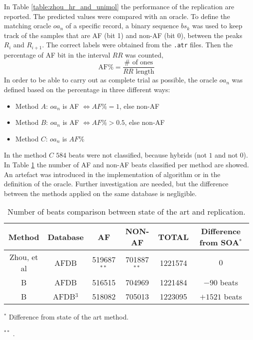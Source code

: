 In Table \ref{table:zhou_hr_and_unimol} the performance of the replication are reported. The predicted values were compared with an oracle. To define the matching oracle $oa_n$ of a specific record, a binary sequence $bs_k$ was used to keep track of the samples that are AF (bit 1) and non-AF (bit 0), between the peaks $R_i$ and $R_{i+1}$. The correct labels were obtained from the \verb|.atr| files. Then the percentage of AF bit in the interval $RR$ was counted,
\begin{equation}
 \text{AF\%} = \frac{\# \text{ of ones}}{RR \text{ length}}
\end{equation}
In order to be able to carry out as complete trial as possible, the oracle $oa_n$ was defined based on the percentage in three different ways:
\begin{itemize}
\item Method $A$: $oa_n$ is AF $\iff AF\% = 1$, else non-AF
\item Method $B$: $oa_n$ is AF $\iff AF\% > 0.5$, else non-AF
\item Method $C$: $oa_n$ is $AF\%$
\end{itemize}
In the method $C$ $584$ beats were not classified, because hybrids (not $1$ and not $0$). In Table \ref{table:replication_error} the number of AF and non-AF beats classified per method are showed. An artefact was introduced in the implementation of algorithm or in the definition of the oracle. Further investigation are needed, but the difference between the methods applied on the same database is negligible.
\begin{table}
\begin{center}
\begin{threeparttable}
\caption{Number of beats comparison between state of the art and replication.}
\label{table:replication_error}
\scriptsize
  \begin{tabular}{c c c c c c}
  \toprule
  \textbf{Method} & \textbf{Database} & \textbf{AF} & \textbf{NON-AF} & \textbf{TOTAL} & \textbf{Difference from SOA}$^*$ \\
  \midrule  
  Zhou, et al\cite{zhou2015} & AFDB & 519687$^{**}$ & 701887$^{**}$ & 1221574 & $0$ \\
  B & AFDB & 516515 & 704969 & 1221484 & $-90$ beats\\
  B & AFDB$^3$ & 518082 & 705013 & 1223095 & $+1521$ beats \\
  \bottomrule
\end{tabular}
\begin{tablenotes}
 	\item $^*$ Difference from state of the art method.
 	\item $^{**}$ \cite[p. 9]{zhou2015}.
    \end{tablenotes}
\end{threeparttable}
\end{center}
\end{table}

